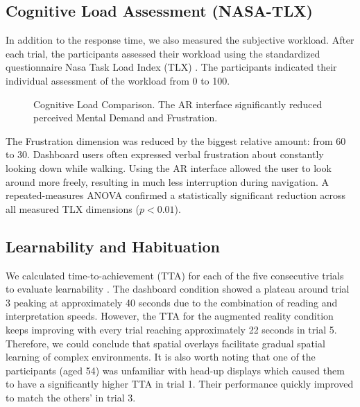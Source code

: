 \documentclass[conference]{IEEEtran}
\begin{document}
\subsection{Cognitive Load Assessment (NASA-TLX)}

In addition to the response time, we also measured the subjective workload. After each trial, the participants assessed their workload using the standardized questionnaire Nasa Task Load Index (TLX) \cite{b8}. The participants indicated their individual assessment of the workload from 0 to 100.

\begin{figure}[htbp]
\centering
{}
\caption{Cognitive Load Comparison. The AR interface significantly reduced perceived Mental Demand and Frustration.}
\label{fig:tlx}
\end{figure}

The Frustration dimension was reduced by the biggest relative amount: from 60 to 30. Dashboard users often expressed verbal frustration about constantly looking down while walking. Using the AR interface allowed the user to look around more freely, resulting in much less interruption during navigation. A repeated-measures ANOVA confirmed a statistically significant reduction across all measured TLX dimensions ($p < 0.01$).

\subsection{Learnability and Habituation}
We calculated time-to-achievement (TTA) for each of the five consecutive trials to evaluate learnability \cite{b1}. The dashboard condition showed a plateau around trial 3 peaking at approximately 40 seconds due to the combination of reading and interpretation speeds. However, the TTA for the augmented reality condition keeps improving with every trial reaching approximately 22 seconds in trial 5. Therefore, we could conclude that spatial overlays facilitate gradual spatial learning of complex environments. It is also worth noting that one of the participants (aged 54) was unfamiliar with head-up displays which caused them to have a significantly higher TTA in trial 1. Their performance quickly improved to match the others’ in trial 3.
\end{document}
